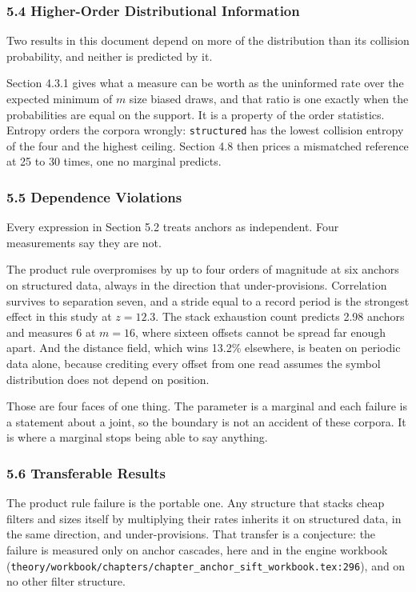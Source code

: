 \subsubsection{5.4 Higher-Order Distributional Information}

Two results in this document depend on more of the distribution than its collision probability, and neither is predicted by it.

Section 4.3.1 gives what a measure can be worth as the uninformed rate over the expected minimum of \(m\) size biased draws, and that ratio is one exactly when the probabilities are equal on the support. It is a property of the order statistics. Entropy orders the corpora wrongly: \texttt{structured} has the lowest collision entropy of the four and the highest ceiling. Section 4.8 then prices a mismatched reference at 25 to 30 times, one no marginal predicts.

\subsubsection{5.5 Dependence Violations}

Every expression in Section 5.2 treats anchors as independent. Four measurements say they are not.

The product rule overpromises by up to four orders of magnitude at six anchors on structured data, always in the direction that under-provisions. Correlation survives to separation seven, and a stride equal to a record period is the strongest effect in this study at \(z = 12.3\). The stack exhaustion count predicts 2.98 anchors and measures 6 at \(m = 16\), where sixteen offsets cannot be spread far enough apart. And the distance field, which wins 13.2\% elsewhere, is beaten on periodic data alone, because crediting every offset from one read assumes the symbol distribution does not depend on position.

Those are four faces of one thing. The parameter is a marginal and each failure is a statement about a joint, so the boundary is not an accident of these corpora. It is where a marginal stops being able to say anything.

\subsubsection{5.6 Transferable Results}

The product rule failure is the portable one. Any structure that stacks cheap filters and sizes itself by multiplying their rates inherits it on structured data, in the same direction, and under-provisions. That transfer is a conjecture: the failure is measured only on anchor cascades, here and in the engine workbook (\texttt{theory/\allowbreak{}workbook/\allowbreak{}chapters/\allowbreak{}chapter\_anchor\_sift\_workbook.tex:296}), and on no other filter structure.


